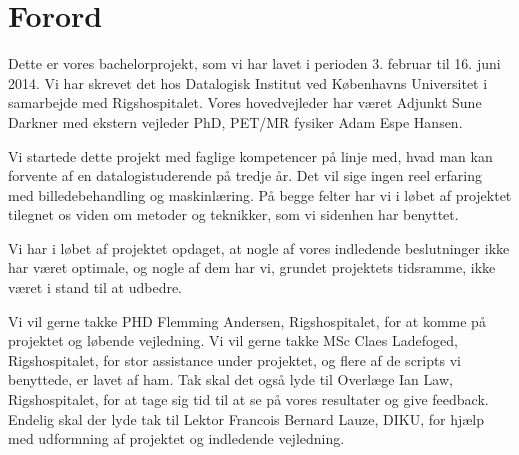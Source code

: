 \section{Forord}

Dette er vores bachelorprojekt, som vi har lavet i perioden 3.
februar til 16. juni 2014. Vi har skrevet det hos Datalogisk Institut
ved Københavns Universitet i samarbejde med Rigshospitalet. Vores
hovedvejleder har været Adjunkt Sune Darkner med ekstern vejleder PhD,
PET/MR fysiker Adam Espe Hansen.

Vi startede dette projekt med faglige kompetencer på linje med, hvad
man kan forvente af en datalogistuderende på tredje år. Det vil sige
ingen reel erfaring med billedebehandling og maskinlæring. På begge
felter har vi i løbet af projektet tilegnet os viden om metoder og
teknikker, som vi sidenhen har benyttet.

Vi har i løbet af projektet opdaget, at nogle af vores indledende
beslutninger ikke har været optimale, og nogle af dem har vi, grundet
projektets tidsramme, ikke været i stand til at udbedre.

Vi vil gerne takke PHD Flemming Andersen, Rigshospitalet, for at komme på
projektet og løbende vejledning. Vi vil gerne takke MSc Claes Ladefoged,
Rigshospitalet, for stor assistance under projektet, og flere af de
scripts vi benyttede, er lavet af ham. Tak skal det også lyde til Overlæge
Ian Law, Rigshospitalet, for at tage sig tid til at se på vores resultater
og give feedback.
Endelig skal der lyde tak til Lektor Francois Bernard Lauze, DIKU, for
hjælp med udformning af projektet og indledende vejledning.


